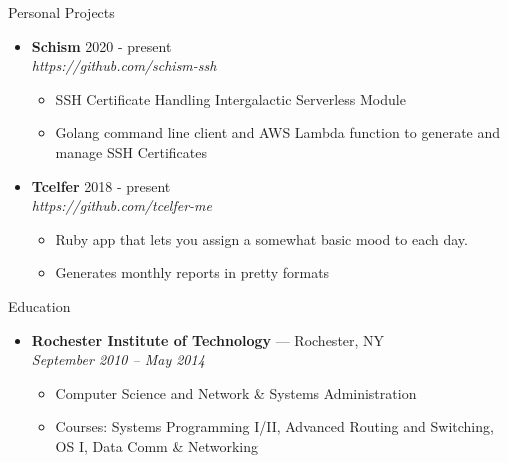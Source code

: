 \documentclass[10pt,oneside]{article}
\newenvironment{ressection}[1]{
	\vspace{2pt}
	{\fontfamily{bch}\selectfont\Large#1}
	\begin{itemize}
	\vspace{1pt}
}{
	\end{itemize}
}
\newcommand{\resitem}[1]{
	\vspace{-2pt}
	\item \begin{flushleft} #1 \end{flushleft}
}
\newcommand{\ressubitem}[1]{
	\vspace{-1pt}
	\item \begin{flushleft} #1 \end{flushleft}
}
\newcommand{\resbigitem}[3]{
	\vspace{-3pt}
	\item
	\textbf{#1} --- #2 \\
	\textit{#3}
}
\newcommand{\resaltitem}[3]{
	\vspace{-3pt}
	\item
	\textbf{#1} \hfill #2 \\
	\textit{#3}
}
\newenvironment{ressubsec}[3]{
	\resbigitem{#1}{#2}{#3}
	\vspace{-1pt}
	\begin{itemize}
}{
	\end{itemize}
}
\newenvironment{resaltsec}[3]{
	\resaltitem{#1}{#2}{#3}
	\vspace{-1pt}
	\begin{itemize}
}{
	\end{itemize}
}
\begin{document}
\begin{ressection}{Personal Projects}

	\begin{resaltsec}{Schism}{2020 - present}{https://github.com/schism-ssh}
		\ressubitem{SSH Certificate Handling Intergalactic Serverless Module}
		\ressubitem{Golang command line client and AWS Lambda function to generate and manage SSH Certificates}
	\end{resaltsec}

	\begin{resaltsec}{Tcelfer}{2018 - present}{https://github.com/tcelfer-me}
		\ressubitem{Ruby app that lets you assign a somewhat basic mood to each day.}
		\ressubitem{Generates monthly reports in pretty formats}
	\end{resaltsec}




\end{ressection}


\begin{ressection}{Education}

	\begin{ressubsec}{Rochester Institute of Technology}{Rochester, NY}{September 2010 -- May 2014}
		\ressubitem{Computer Science and Network \& Systems Administration}
		\ressubitem{Courses: Systems Programming I/II, Advanced Routing and Switching, OS I, Data Comm \& Networking}
	\end{ressubsec}

\end{ressection}


% 
% 
\end{document}
